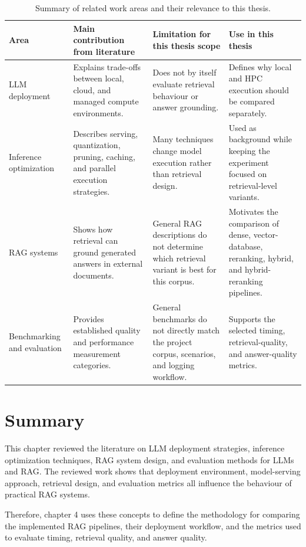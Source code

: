 \begin{table}[htbp]
\centering
\small
\begin{tabularx}{\textwidth}{>{\raggedright\arraybackslash}p{}>{\raggedright\arraybackslash}X>{\raggedright\arraybackslash}X>{\raggedright\arraybackslash}X}
\toprule
\textbf{Area} & \textbf{Main contribution from literature} & \textbf{Limitation for this thesis scope} & \textbf{Use in this thesis} \\
\midrule
\ac{LLM} deployment & Explains trade-offs between local, cloud, and managed compute environments. & Does not by itself evaluate retrieval behaviour or answer grounding. & Defines why local and \ac{HPC} execution should be compared separately. \\
Inference optimization & Describes serving, quantization, pruning, caching, and parallel execution strategies. & Many techniques change model execution rather than retrieval design. & Used as background while keeping the experiment focused on retrieval-level variants. \\
\ac{RAG} systems & Shows how retrieval can ground generated answers in external documents. & General \ac{RAG} descriptions do not determine which retrieval variant is best for this corpus. & Motivates the comparison of dense, vector-database, reranking, hybrid, and hybrid-reranking pipelines. \\
Benchmarking and evaluation & Provides established quality and performance measurement categories. & General benchmarks do not directly match the project corpus, scenarios, and logging workflow. & Supports the selected timing, retrieval-quality, and answer-quality metrics. \\
\bottomrule
\end{tabularx}
\caption{Summary of related work areas and their relevance to this thesis.}
\label{tab:literature-positioning}
\end{table}

\section{Summary}

This chapter reviewed the literature on \ac{LLM} deployment strategies, inference optimization techniques, \ac{RAG} system design, and evaluation methods for \acp{LLM} and \ac{RAG}. The reviewed work shows that deployment environment, model-serving approach, retrieval design, and evaluation metrics all influence the behaviour of practical \ac{RAG} systems.

Therefore, chapter 4 uses these concepts to define the methodology for comparing the implemented \ac{RAG} pipelines, their deployment workflow, and the metrics used to evaluate timing, retrieval quality, and answer quality.